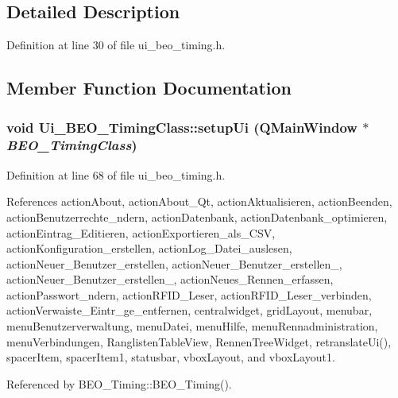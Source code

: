 \subsection{Detailed Description}


Definition at line 30 of file ui\_\-beo\_\-timing.h.

\subsection{Member Function Documentation}
\hypertarget{class_ui___b_e_o___timing_class_1c3e4c81dd35c43209c07487ed5a841c}{
\subsubsection[setupUi]{\setlength{\rightskip}{0pt plus 5cm}void Ui\_\-BEO\_\-TimingClass::setupUi (QMainWindow $\ast$ {\em BEO\_\-TimingClass})}}
\label{class_ui___b_e_o___timing_class_1c3e4c81dd35c43209c07487ed5a841c}




Definition at line 68 of file ui\_\-beo\_\-timing.h.

References actionAbout, actionAbout\_\-Qt, actionAktualisieren, actionBeenden, actionBenutzerrechte\_\-ndern, actionDatenbank, actionDatenbank\_\-optimieren, actionEintrag\_\-Editieren, actionExportieren\_\-als\_\-CSV, actionKonfiguration\_\-erstellen, actionLog\_\-Datei\_\-auslesen, actionNeuer\_\-Benutzer\_\-erstellen, actionNeuer\_\-Benutzer\_\-erstellen\_, actionNeuer\_\-Benutzer\_\-erstellen\_, actionNeues\_\-Rennen\_\-erfassen, actionPasswort\_\-ndern, actionRFID\_\-Leser, actionRFID\_\-Leser\_\-verbinden, actionVerwaiste\_\-Eintr\_\-ge\_\-entfernen, centralwidget, gridLayout, menubar, menuBenutzerverwaltung, menuDatei, menuHilfe, menuRennadministration, menuVerbindungen, RanglistenTableView, RennenTreeWidget, retranslateUi(), spacerItem, spacerItem1, statusbar, vboxLayout, and vboxLayout1.

Referenced by BEO\_\-Timing::BEO\_\-Timing().

